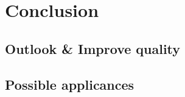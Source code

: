 \section{Conclusion}
\label{sec: discussion}

\subsection{Outlook \& Improve quality}

\subsection{Possible applicances}
